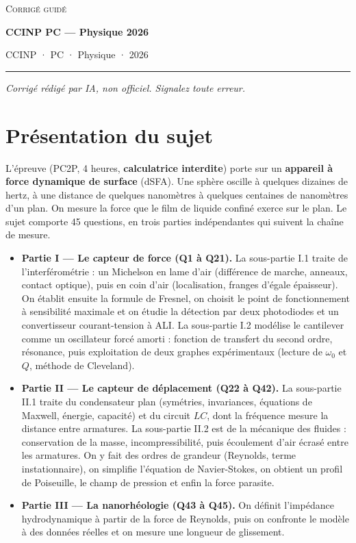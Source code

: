 \documentclass[11pt,a4paper]{article}
\providecommand{\tightlist}{\setlength{\itemsep}{0pt}\setlength{\parskip}{0pt}}
\begin{document}
\thispagestyle{plain}
\begin{center}
  {\small\scshape Corrigé guidé}\par\smallskip
  {\LARGE\bfseries CCINP PC — Physique 2026\par}\medskip
  {\large CCINP · PC · Physique · 2026\par}
\end{center}
\vspace{2pt}\hrule\vspace{8pt}

\emph{Corrigé rédigé par IA, non officiel. Signalez toute erreur.}

\hypertarget{pruxe9sentation-du-sujet}{%
\section{Présentation du sujet}\label{pruxe9sentation-du-sujet}}

L'épreuve (PC2P, 4 heures, \textbf{calculatrice interdite}) porte sur un \textbf{appareil à force dynamique de surface} (dSFA). Une sphère oscille à quelques dizaines de hertz, à une distance de quelques nanomètres à quelques centaines de nanomètres d'un plan. On mesure la force que le film de liquide confiné exerce sur le plan. Le sujet comporte 45 questions, en trois parties indépendantes qui suivent la chaîne de mesure.

\begin{itemize}
\tightlist
\item
  \textbf{Partie I --- Le capteur de force (Q1 à Q21).} La sous-partie I.1 traite de l'interférométrie : un Michelson en lame d'air (différence de marche, anneaux, contact optique), puis en coin d'air (localisation, franges d'égale épaisseur). On établit ensuite la formule de Fresnel, on choisit le point de fonctionnement à sensibilité maximale et on étudie la détection par deux photodiodes et un convertisseur courant-tension à ALI. La sous-partie I.2 modélise le cantilever comme un oscillateur forcé amorti : fonction de transfert du second ordre, résonance, puis exploitation de deux graphes expérimentaux (lecture de \(\omega_0\) et \(Q\), méthode de Cleveland).
\item
  \textbf{Partie II --- Le capteur de déplacement (Q22 à Q42).} La sous-partie II.1 traite du condensateur plan (symétries, invariances, équations de Maxwell, énergie, capacité) et du circuit \(LC\), dont la fréquence mesure la distance entre armatures. La sous-partie II.2 est de la mécanique des fluides : conservation de la masse, incompressibilité, puis écoulement d'air écrasé entre les armatures. On y fait des ordres de grandeur (Reynolds, terme instationnaire), on simplifie l'équation de Navier-Stokes, on obtient un profil de Poiseuille, le champ de pression et enfin la force parasite.
\item
  \textbf{Partie III --- La nanorhéologie (Q43 à Q45).} On définit l'impédance hydrodynamique à partir de la force de Reynolds, puis on confronte le modèle à des données réelles et on mesure une longueur de glissement.
\end{itemize}
\end{document}
